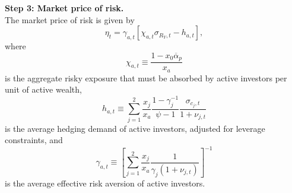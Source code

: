 
\noindent\textbf{Step 3: Market price of risk.}\\
The market price of risk is given by
\begin{equation}
    \eta_t = \gamma_{a,t}\left[\chi_{a,t}\sigma_{R_Y,t} - h_{a,t}\right],
\end{equation}
where
\begin{equation}
    \chi_{a,t} \equiv \frac{1-x_0\overline{\alpha}_{p}}{x_a}
\end{equation}
is the aggregate risky exposure that must be absorbed by active investors per unit of active wealth,
\begin{equation}
    h_{a,t} \equiv \sum_{j=1}^2 \frac{x_j}{x_a}
    \frac{1-\gamma_j^{-1}}{\psi-1}\frac{\sigma_{c_j,t}}{1+\nu_{j,t}}
\end{equation}
is the average hedging demand of active investors, adjusted for leverage constraints, and
\begin{equation}
    \gamma_{a,t} \equiv \left[\sum_{j=1}^2 \frac{x_j}{x_a}
    \frac{1}{\gamma_j(1+\nu_{j,t})}\right]^{-1}
\end{equation}
is the average effective risk aversion of active investors.

